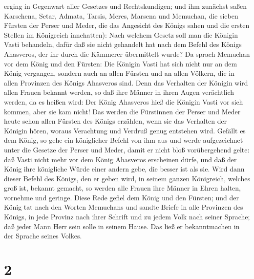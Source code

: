 erging in Gegenwart aller Gesetzes und Rechtskundigen; 
und ihm zunächst saßen Karschena, Setar, Admata, Tarsis, Meres, Marsena
und Memuchan, die sieben Fürsten der Perser und Meder, die das Angesicht
des Königs sahen und die ersten Stellen im Königreich innehatten):
 Nach welchem Gesetz soll man die Königin Vasti
behandeln, dafür daß sie nicht gehandelt hat nach dem Befehl des Königs
Ahasveros, der ihr durch die Kämmerer übermittelt wurde? 
Da sprach Memuchan vor dem König und den Fürsten: Die Königin Vasti hat
sich nicht nur an dem König vergangen, sondern auch an allen Fürsten und
an allen Völkern, die in allen Provinzen des Königs Ahasveros sind.
 Denn das Verhalten der Königin wird allen Frauen bekannt
werden, so daß ihre Männer in ihren Augen verächtlich werden, da es
heißen wird: Der König Ahasveros hieß die Königin Vasti vor sich kommen,
aber sie kam nicht!  Das werden die Fürstinnen der Perser
und Meder heute schon allen Fürsten des Königs erzählen, wenn sie das
Verhalten der Königin hören, woraus Verachtung und Verdruß genug
entstehen wird.  Gefällt es dem König, so gehe ein
königlicher Befehl von ihm aus und werde aufgezeichnet unter die Gesetze
der Perser und Meder, damit er nicht bloß vorübergehend gelte: daß Vasti
nicht mehr vor dem König Ahasveros erscheinen dürfe, und daß der König
ihre königliche Würde einer andern gebe, die besser ist als sie.
 Wird dann dieser Befehl des Königs, den er geben wird,
in seinem ganzen Königreich, welches groß ist, bekannt gemacht, so
werden alle Frauen ihre Männer in Ehren halten, vornehme und geringe.
 Diese Rede gefiel dem König und den Fürsten; und der
König tat nach den Worten Memuchans  und sandte Briefe in
alle Provinzen des Königs, in jede Provinz nach ihrer Schrift und zu
jedem Volk nach seiner Sprache; daß jeder Mann Herr sein solle in seinem
Hause. Das ließ er bekanntmachen in der Sprache seines Volkes.

\hypertarget{section-1}{%
\section{2}\label{section-1}}

